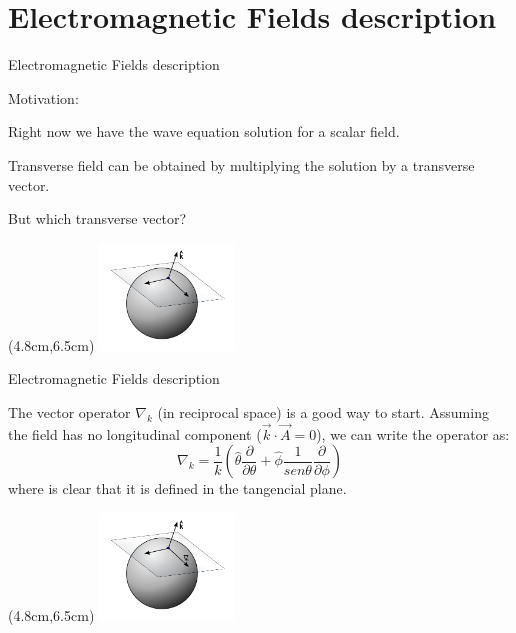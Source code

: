 \documentclass[10pt]{beamer}
\begin{document}

\section{Electromagnetic Fields description}


\begin{frame}[fragile]{Electromagnetic Fields description}

Motivation: 
  \begin{center}
  Right now we have the wave equation solution for a scalar field.

  Transverse field can be obtained by multiplying the solution by a transverse vector.

  \alert{But which transverse vector?}
  \end{center}
        \begin{textblock*}{3cm}(4.8cm,6.5cm)
            \includegraphics[width=3.6cm]{tangesfk}
        \end{textblock*}

\end{frame}


\begin{frame}[fragile]{Electromagnetic Fields description}

The vector operator $\nabla_k$ (in reciprocal space) is a good way to start. Assuming the field has no longitudinal component ($\vec{k} \cdot \vec{A}=0$), we can write the operator as:
      \begin{equation*}
          \nabla_k = \frac{1}{k}\left(\hat{\theta}\frac{\partial}{\partial\theta} + \hat{\phi}\frac{1}{sen\theta}\frac{\partial}{\partial\phi}\right)
      \end{equation*}
where is clear that it is defined in the tangencial plane.
        \begin{textblock*}{3cm}(4.8cm,6.5cm)
            \includegraphics[width=3.6cm]{tangesfkd}
        \end{textblock*}
\end{frame}
\end{document}
